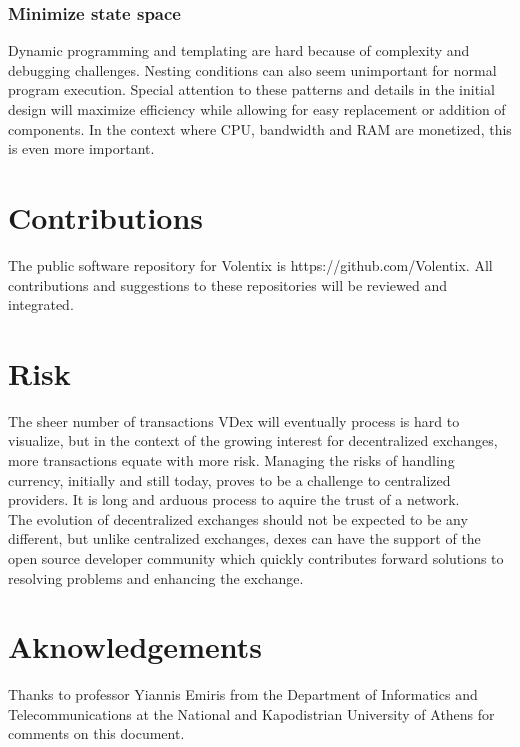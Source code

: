 \documentclass[]{article}
\begin{document}
	\subsubsection{Minimize state space}
	Dynamic programming and templating are hard because of complexity and debugging challenges. 
	Nesting conditions can also seem unimportant for normal program execution.
	Special attention to these patterns and details in the initial design will maximize efficiency while allowing for easy replacement or addition of components.   
	In the context where CPU, bandwidth and RAM are monetized, this is even more important. 

\section{Contributions}
The public software repository for Volentix is https://github.com/Volentix.
All contributions and suggestions to these repositories will be reviewed and integrated. 
	
\section{Risk}
	The sheer number of transactions VDex will eventually process is hard to visualize, 
	but in the context of the growing interest for decentralized exchanges, more transactions equate with more risk. 
	Managing the risks of handling currency, initially and still today, proves to be a challenge to centralized providers. It is long and arduous process to aquire
	the trust of a network.\\
	 The evolution of decentralized exchanges should not be expected to be any different, but unlike centralized exchanges, 
	dexes can have the support of the open source developer community which quickly contributes 
	forward solutions to resolving problems and enhancing the exchange. \\
	

\paragraph{}
\paragraph{}	

\section{Aknowledgements}
Thanks to professor Yiannis Emiris
from the Department of Informatics and Telecommunications 
at the National and Kapodistrian University of Athens for comments on this document.
	
\end{document}
